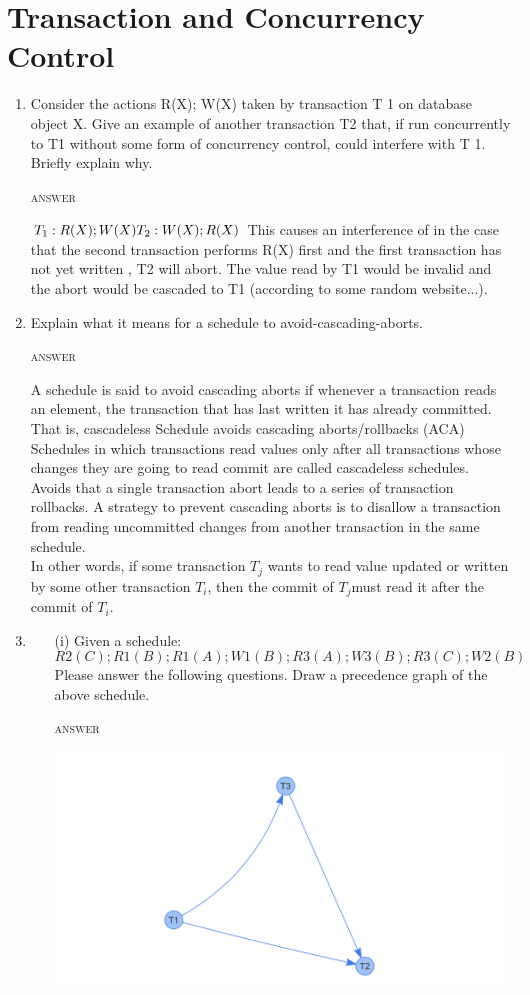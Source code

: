 \documentclass[a4paper, 11pt]{article}
\begin{document}
\section{Transaction and Concurrency Control}
\begin{enumerate}
\item Consider the actions R(X); W(X) taken by transaction T 1 on database object X. Give an example of another transaction T2 that, if run concurrently to T1 without some form of concurrency control, could interfere with T 1. Briefly explain why.

\textsc{answer}

$T_1: R(X); W(X)\\
T_2: W(X); R(X)\\
$
This causes an interference of in the case that the second transaction performs R(X) first and the first transaction has not yet written , T2 will abort. The value read by T1 would be invalid and the abort would be cascaded to T1 (according to some random website...).

\item Explain what it means for a schedule to avoid-cascading-aborts.

\textsc{answer}

A schedule is said to avoid cascading aborts if whenever a transaction reads an element, the transaction that has last written it has already committed. That is, cascadeless Schedule avoids cascading aborts/rollbacks (ACA) Schedules in which transactions 
read values only after all transactions whose changes they are going to read commit are called 
cascadeless schedules. Avoids that a single transaction abort leads to a series of transaction rollbacks. 
A strategy to prevent cascading aborts is to disallow a transaction from reading uncommitted changes 
from another transaction in the same schedule.\\
In other words, if some transaction $T_j$ wants to read value updated or written by some other 
transaction $T_i$, then the commit of $T_j $must read it after the commit of $T_i$.

\item
	\begin{itemize}
	\item[(i)] 
 Given a schedule:
                $$R2(C); R1(B); R1(A); W1(B); R3(A); W3(B); R3(C); W2(B)$$
Please answer the following questions.
Draw a precedence graph of the above schedule.

\textsc{answer}

\includegraphics[width=\textwidth]{precedenceG.png}


\end{itemize}
\end{enumerate}
\end{document}
